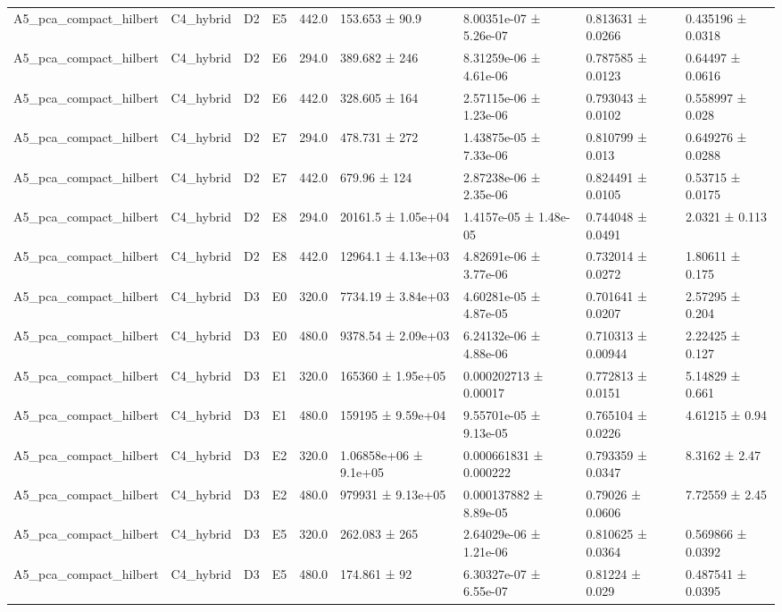 \begin{table}
\begin{tabular}{lllllllll}
A5\_pca\_compact\_hilbert & C4\_hybrid & D2 & E5 & 442.0 & 153.653 ± 90.9 & 8.00351e-07 ± 5.26e-07 & 0.813631 ± 0.0266 & 0.435196 ± 0.0318 \\
A5\_pca\_compact\_hilbert & C4\_hybrid & D2 & E6 & 294.0 & 389.682 ± 246 & 8.31259e-06 ± 4.61e-06 & 0.787585 ± 0.0123 & 0.64497 ± 0.0616 \\
A5\_pca\_compact\_hilbert & C4\_hybrid & D2 & E6 & 442.0 & 328.605 ± 164 & 2.57115e-06 ± 1.23e-06 & 0.793043 ± 0.0102 & 0.558997 ± 0.028 \\
A5\_pca\_compact\_hilbert & C4\_hybrid & D2 & E7 & 294.0 & 478.731 ± 272 & 1.43875e-05 ± 7.33e-06 & 0.810799 ± 0.013 & 0.649276 ± 0.0288 \\
A5\_pca\_compact\_hilbert & C4\_hybrid & D2 & E7 & 442.0 & 679.96 ± 124 & 2.87238e-06 ± 2.35e-06 & 0.824491 ± 0.0105 & 0.53715 ± 0.0175 \\
A5\_pca\_compact\_hilbert & C4\_hybrid & D2 & E8 & 294.0 & 20161.5 ± 1.05e+04 & 1.4157e-05 ± 1.48e-05 & 0.744048 ± 0.0491 & 2.0321 ± 0.113 \\
A5\_pca\_compact\_hilbert & C4\_hybrid & D2 & E8 & 442.0 & 12964.1 ± 4.13e+03 & 4.82691e-06 ± 3.77e-06 & 0.732014 ± 0.0272 & 1.80611 ± 0.175 \\
A5\_pca\_compact\_hilbert & C4\_hybrid & D3 & E0 & 320.0 & 7734.19 ± 3.84e+03 & 4.60281e-05 ± 4.87e-05 & 0.701641 ± 0.0207 & 2.57295 ± 0.204 \\
A5\_pca\_compact\_hilbert & C4\_hybrid & D3 & E0 & 480.0 & 9378.54 ± 2.09e+03 & 6.24132e-06 ± 4.88e-06 & 0.710313 ± 0.00944 & 2.22425 ± 0.127 \\
A5\_pca\_compact\_hilbert & C4\_hybrid & D3 & E1 & 320.0 & 165360 ± 1.95e+05 & 0.000202713 ± 0.00017 & 0.772813 ± 0.0151 & 5.14829 ± 0.661 \\
A5\_pca\_compact\_hilbert & C4\_hybrid & D3 & E1 & 480.0 & 159195 ± 9.59e+04 & 9.55701e-05 ± 9.13e-05 & 0.765104 ± 0.0226 & 4.61215 ± 0.94 \\
A5\_pca\_compact\_hilbert & C4\_hybrid & D3 & E2 & 320.0 & 1.06858e+06 ± 9.1e+05 & 0.000661831 ± 0.000222 & 0.793359 ± 0.0347 & 8.3162 ± 2.47 \\
A5\_pca\_compact\_hilbert & C4\_hybrid & D3 & E2 & 480.0 & 979931 ± 9.13e+05 & 0.000137882 ± 8.89e-05 & 0.79026 ± 0.0606 & 7.72559 ± 2.45 \\
A5\_pca\_compact\_hilbert & C4\_hybrid & D3 & E5 & 320.0 & 262.083 ± 265 & 2.64029e-06 ± 1.21e-06 & 0.810625 ± 0.0364 & 0.569866 ± 0.0392 \\
A5\_pca\_compact\_hilbert & C4\_hybrid & D3 & E5 & 480.0 & 174.861 ± 92 & 6.30327e-07 ± 6.55e-07 & 0.81224 ± 0.029 & 0.487541 ± 0.0395 \\

\end{tabular}
\end{table}
